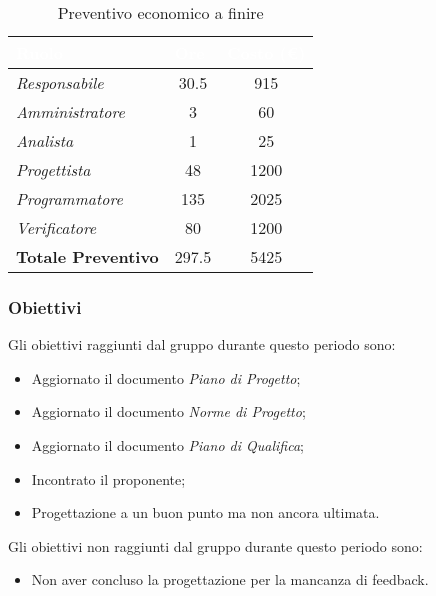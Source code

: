 \begin{table}[H]
    \renewcommand\arraystretch{1.5}
    \centering
    \begin{tabular}{|l|c|c|}
    \hline
    \rowcolor[HTML]{036400}
    \textcolor{white}{\textbf{Ruolo}} & \multicolumn{1}{l|}{\textcolor{white}{\textbf{Ore}}} & \multicolumn{1}{l|}{\textcolor{white}{\textbf{Costo (€)}}} \\ \hline
    \rowcolor[HTML]{EFEFEF}\textit{Responsabile}      & 30.5            & 915                 \\ \hline
    \rowcolor[HTML]{C0C0C0}\textit{Amministratore}    & 3               & 60                 \\ \hline
    \rowcolor[HTML]{EFEFEF}\textit{Analista}          & 1               & 25                 \\ \hline
    \rowcolor[HTML]{C0C0C0}\textit{Progettista}       & 48              & 1200                 \\ \hline
    \rowcolor[HTML]{EFEFEF}\textit{Programmatore}     & 135             & 2025                 \\ \hline
    \rowcolor[HTML]{C0C0C0}\textit{Verificatore}      & 80              & 1200                 \\ \hline
    \rowcolor[HTML]{EFEFEF}\textbf{Totale Preventivo} & 297.5           & 5425            \\ \hline
    \end{tabular}
    \caption{Preventivo economico a finire}
\end{table}

\subsubsection{Obiettivi}
Gli obiettivi raggiunti dal gruppo durante questo periodo sono:
\begin{itemize}
    \item Aggiornato il documento \textit{Piano di Progetto};
    \item Aggiornato il documento \textit{Norme di Progetto};
    \item Aggiornato il documento \textit{Piano di Qualifica};
    \item Incontrato il proponente;
    \item Progettazione a un buon punto ma non ancora ultimata.
\end{itemize}
Gli obiettivi non raggiunti dal gruppo durante questo periodo sono:
\begin{itemize}
    \item Non aver concluso la progettazione per la mancanza di feedback.
\end{itemize}

